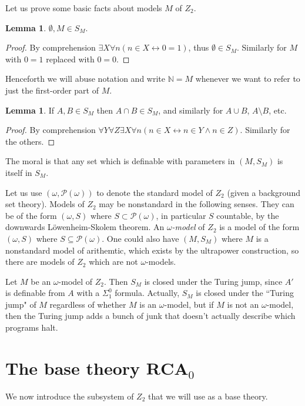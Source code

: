 \documentclass[12pt]{book}
\newcommand{\NN}{\mathbb{N}}
\newcommand{\RCA}{\mathbf{RCA}}
\newcommand{\dfn}[1]{\emph{#1}\index{#1}}
\theoremstyle{definition}
\newtheorem{lemma}[theorem]{Lemma}
\newenvironment{definition}
  {\pushQED{\qed}\renewcommand{\qedsymbol}{$\diamondsuit$}\definitionx}
  {\popQED\endexamplex}
\newenvironment{example}
  {\pushQED{\qed}\renewcommand{\qedsymbol}{$\diamondsuit$}\examplex}
  {\popQED\endexamplex}
\begin{document}
Let us prove some basic facts about models $M$ of $Z_2$.
\begin{lemma}
$\emptyset, M \in S_M$.
\end{lemma}
\begin{proof}
By comprehension $\exists X \forall n(n \in X \leftrightarrow 0 = 1)$, thus $\emptyset \in S_M$. Similarly for $M$ with $0 = 1$ replaced with $0 = 0$.
\end{proof}
Henceforth we will abuse notation and write $\NN = M$ whenever we want to refer to just the first-order part of $M$.

\begin{lemma}
If $A, B \in S_M$ then $A \cap B \in S_M$, and similarly for $A \cup B$, $A \setminus B$, etc.
\end{lemma}
\begin{proof}
By comprehension $\forall Y \forall Z \exists X \forall n(n \in X \leftrightarrow n \in Y \wedge n \in Z)$.
Similarly for the others.
\end{proof}

The moral is that any set which is definable with parameters in $(M, S_M)$ is itself in $S_M$.

Let us use $(\omega, \mathscr P(\omega))$ to denote the standard model of $Z_2$ (given a background set theory).
Models of $Z_2$ may be nonstandard in the following senses. They can be of the form $(\omega, S)$ where $S \subset \mathscr P(\omega)$, in particular $S$ countable, by the downwards L\"owenheim-Skolem theorem.
\begin{definition}
An \dfn{$\omega$-model} of $Z_2$ is a model of the form $(\omega, S)$ where $S \subseteq \mathscr P(\omega)$.
\end{definition}
One could also have $(M, S_M)$ where $M$ is a nonstandard model of arithemtic, which exists by the ultrapower construction, so there are models of $Z_2$ which are not $\omega$-models.

\begin{example}
Let $M$ be an $\omega$-model of $Z_2$. Then $S_M$ is closed under the Turing jump, since $A'$ is definable from $A$ with a $\Sigma_1^0$ formula.
Actually, $S_M$ is closed under the ``Turing jump" of $M$ regardless of whether $M$ is an $\omega$-model, but if $M$ is not an $\omega$-model, then the Turing jump adds a bunch of junk that doesn't actually describe which programs halt.
\end{example}

\section{The base theory $\RCA_0$}
We now introduce the subsystem of $Z_2$ that we will use as a base theory.
\end{document}
